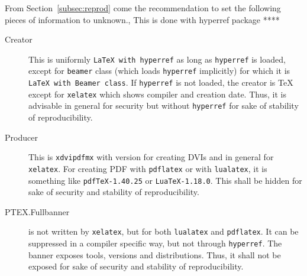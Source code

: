 \documentclass[a4paper, english]{article}%
\newcommand{\pdflatex}{\texttt{pdflatex}}
\newcommand{\lualatex}{\texttt{lualatex}}
\newcommand{\xelatex}{\texttt{xelatex}}
\newcommand{\cmd}[1]{\texttt{\textbackslash#1}}
\begin{document}
From Section~\ref{subsec:reprod} come the recommendation 
to set the following pieces of information to unknown., 
This is done with hyperref package **** 
%
\begin{description}
  \item[Creator] This is uniformly \texttt{LaTeX with hyperref} 
  as long as \texttt{hyperref} is loaded, except for \texttt{beamer} class 
  (which loads \texttt{hyperref} implicitly)
  for which it is \texttt{LaTeX with Beamer class}. 
  If \texttt{hyperref} is not loaded, 
  the creator is \TeX{} except for \xelatex{} which shows compiler and creation date. 
  Thus, it is advisable in general for security but without \texttt{hyperref} 
  for sake of stability of reproducibility. 
  \item[Producer] This is \texttt{xdvipdfmx} with version for creating DVIs 
  and in general for \xelatex. 
  For creating PDF with \pdflatex{} or with \lualatex, 
  it is something like \texttt{pdfTeX-1.40.25} or \texttt{LuaTeX-1.18.0}. 
  This shall be hidden for sake of security and stability of reproducibility. 



  
  \item[PTEX.Fullbanner] is not written by \xelatex, 
  but for both \lualatex{} and \pdflatex. 
  It can be suppressed in a compiler specific way, 
  but not through \texttt{hyperref}. 
  The banner exposes tools, versions and distributions. 
  Thus, it shall not be exposed for sake of security and stability of reproducibility. 
 

\end{description}
\end{document}
